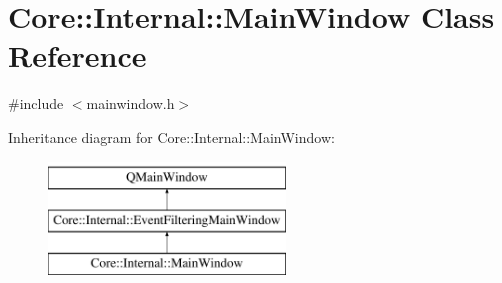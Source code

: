 \hypertarget{class_core_1_1_internal_1_1_main_window}{\section{Core\-:\-:Internal\-:\-:Main\-Window Class Reference}
\label{class_core_1_1_internal_1_1_main_window}
}


{\ttfamily \#include $<$mainwindow.\-h$>$}

Inheritance diagram for Core\-:\-:Internal\-:\-:Main\-Window\-:\begin{figure}[H]
\begin{center}
\leavevmode
\includegraphics[height=3.000000cm]{class_core_1_1_internal_1_1_main_window}
\end{center}
\end{figure}
